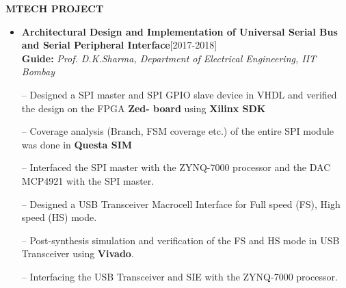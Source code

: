 \documentclass{article}
\begin{document}
 \begin{theorem}
   \vspace{-0.7mm}
\begin{center}
\textbf{ MTECH PROJECT
}\end{center}  
\vspace{-0.7mm}    
   \end{theorem}
\vspace{-3mm}
\begin{itemize}
\setlength{\itemsep} {-0.2em}
\item \textbf{Architectural Design and Implementation of Universal Serial Bus and Serial Peripheral
Interface}\hfill{[2017-2018]}\\
\textbf{Guide:} \textit{Prof. D.K.Sharma, Department of Electrical Engineering, IIT Bombay}

\item[--] Designed a SPI master and SPI GPIO slave device in VHDL and verified the design on the FPGA \textbf{Zed-
board} using \textbf{Xilinx SDK}
\item[--] Coverage analysis (Branch, FSM coverage etc.) of the entire SPI module was done in \textbf{Questa SIM}
\item[--] Interfaced the SPI master with the ZYNQ-7000 processor and the DAC MCP4921 with the SPI master.

\item[--] Designed a USB Transceiver Macrocell Interface for Full speed (FS), High speed (HS) mode.

\item[--] Post-synthesis simulation and verification of the FS and HS mode in USB Transceiver using \textbf{Vivado}.
\item[--] Interfacing the USB Transceiver and SIE with the ZYNQ-7000 processor.

\end{itemize}


\vspace{-3mm}


\end{document}
